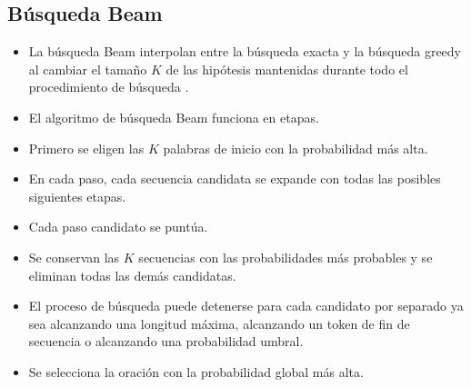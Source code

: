 \subsection{Búsqueda Beam}
\begin{itemize}
\item La búsqueda Beam interpolan entre la búsqueda exacta y la búsqueda greedy al cambiar el tamaño $K$ de las hipótesis mantenidas durante todo el procedimiento de búsqueda \cite{cho2015natural}.
\item El algoritmo de búsqueda Beam funciona en etapas.
\item Primero se eligen las $K$ palabras de inicio con la probabilidad más alta.
\item En cada paso, cada secuencia candidata se expande con todas las posibles siguientes etapas.
\item Cada paso candidato se puntúa.
\item Se conservan las $K$ secuencias con las probabilidades más probables y se eliminan todas las demás candidatas.
\item El proceso de búsqueda puede detenerse para cada candidato por separado ya sea alcanzando una longitud máxima, alcanzando un token de fin de secuencia o alcanzando una probabilidad umbral.
\item Se selecciona la oración con la probabilidad global más alta.
\end{itemize}


